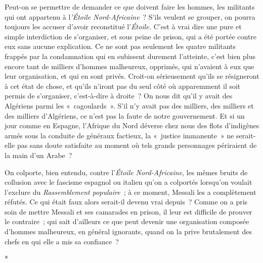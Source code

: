 \documentclass[french,twoside]{book} %
\begin{document}
Peut-on se permettre de demander ce que doivent faire les hommes, les militants qui ont appartenu à l{\itshape 'Étoile Nord-Africaine} ? S'ils veulent se grouper, on pourra toujours les accuser d'avoir reconstitué l'{\itshape Étoile.} C'est à vrai dire une pure et simple interdiction de s'organiser, et sous peine de prison, qui a été portée contre eux sans aucune explication. Ce ne sont pas seulement les quatre militants frappés par la condamnation qui en subissent durement l'atteinte, c'est bien plus encore tant de milliers d'hommes malheureux, opprimés, qui n'avaient à eux que leur organisation, et qui en sont privés. Croit-on sérieu­sement qu'ils se résigneront à cet état de chose, et qu'ils n'iront pas du seul côté où apparemment il soit permis de s'organiser, c'est-à-dire à droite ? On nous dit qu'il y avait des Algériens parmi les « cagoulards ». S'il n'y avait pas des milliers, des milliers et des milliers d'Algériens, ce n'est pas la faute de notre gouvernement. Et si un jour comme en Espagne, l'Afrique du Nord déverse chez nous des flots d'indigènes armés sous la conduite de généraux factieux, la « justice immanente » ne serait-elle pas sans doute satisfaite au moment où tels grands personnages périraient de la main d'un Arabe ?\par
On colporte, bien entendu, contre l'{\itshape Étoile Nord-Africaine}, les mêmes bruits de collusion avec le fascisme espagnol ou italien qu'on a colportés lors­qu'on voulait l'exclure du {\itshape Rassemblement populaire} ; à ce moment, Messali les a complètement réfutés. Ce qui était faux alors serait-il devenu vrai depuis ? Comme on a pris soin de mettre Messali et ses camarades en prison, il leur est difficile de prouver le contraire ; qui sait d'ailleurs ce que peut devenir une organisation composée d'hommes malheureux, en général igno­rants, quand on la prive brutalement des chefs en qui elle a mis sa confiance ?\par

\begin{center}
\noindent \centerline{*}\par
\end{center}
\end{document}
